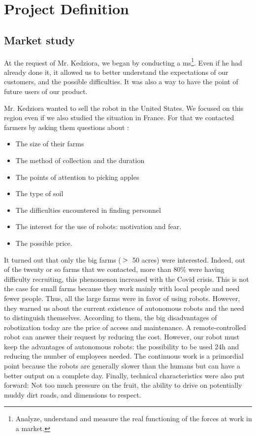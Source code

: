 \section{Project Definition}\insertloftspace
\setcounter{figure}{0}\setcounter{table}{0}
\label{ProDef}
\subsection{Market study}
\label{MarStu}

At the request of Mr. Kedziora, we began by conducting a \gls{ms}\footnote{Analyze, understand and measure the real functioning of the forces at work in a market.}. Even if he had already done it, it allowed us to better understand the expectations of our customers, and the possible difficulties. It was also a way to have the point of future users of our product.

\bigbreak
Mr. Kedziora wanted to sell the robot in the United States. We focused on this region even if we also studied the situation in France. For that we contacted farmers by asking them questions about : 
\begin{itemize}[noitemsep]
    \item The size of their farms
    \item The method of collection and the duration
    \item The points of attention to picking apples
    \item The type of soil
    \item The difficulties encountered in finding personnel
    \item The interest for the use of robots: motivation and fear.
    \item The possible price.
\end{itemize}

It turned out that only the big farms ($\bg$ 50 acres) were interested. Indeed, out of the twenty or so farms that we contacted, more than 80\% were having difficulty recruiting, this phenomenon increased with the Covid crisis. This is not the case for small farms because they work mainly with local people and need fewer people. Thus, all the large farms were in favor of using robots. However, they warned us about the current existence of autonomous robots and the need to distinguish themselves. According to them, the big disadvantages of robotization today are the price of access and maintenance. A remote-controlled robot can answer their request by reducing the cost. However, our robot must keep the advantages of autonomous robots: the possibility to be used 24h and reducing the number of employees needed. The continuous work is a primordial point because the robots are generally slower than the humans but can have a better output on a complete day. Finally, technical characteristics were also put forward: Not too much pressure on the fruit, the ability to drive on potentially muddy dirt roads, and dimensions to respect.

